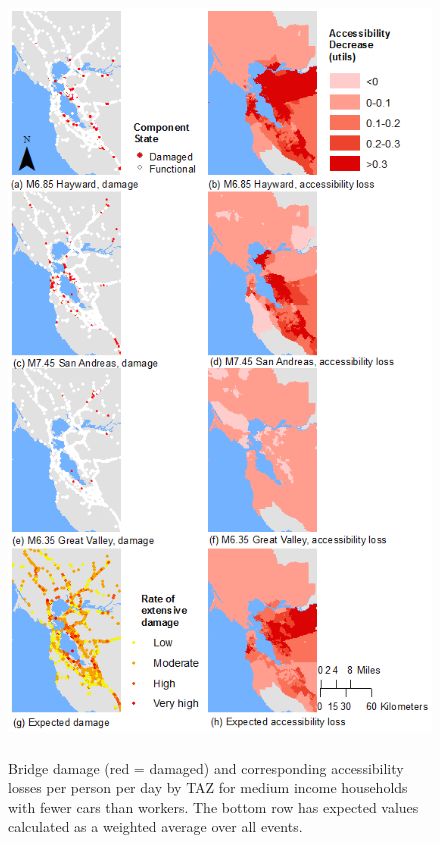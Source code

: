 \begin{figure}[t]
        \includegraphics[height=8in]{FIGS/accByEq.png}
    \caption{Bridge damage (red = damaged) and corresponding accessibility losses per person per day by TAZ for medium income households with fewer cars than workers. The bottom row has expected values calculated as a weighted average over all events.}
\label{fig:scen_acc}
\end{figure}


